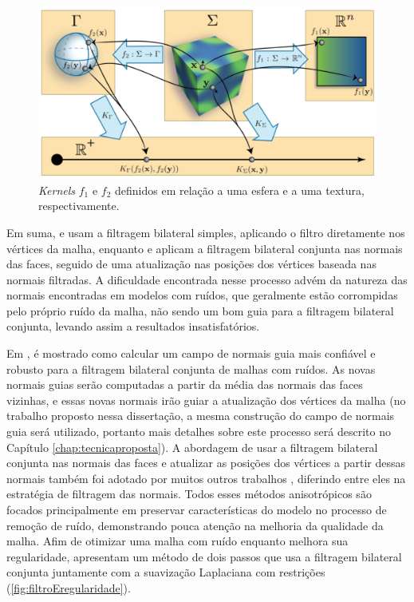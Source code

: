 \begin{figure}[!h]
\captionsetup{width=\linewidth}
\centering
\includegraphics[scale=0.3]{figuras/kernelframework.png}
\caption{\textit{Kernels} $f_1$ e $f_2$ definidos em relação a uma esfera e a uma textura, respectivamente.}
\label{fig:kernelframework}
\end{figure}

Em suma, \cite{fleishman2003bilateral} e \cite{jones2003non} usam a filtragem bilateral simples, aplicando o filtro diretamente nos vértices da malha, enquanto \cite{zheng2011bilateral} e \cite{solomon2014general} aplicam a filtragem bilateral conjunta nas normais das faces, seguido de uma atualização nas posições dos vértices baseada nas normais filtradas. A dificuldade encontrada nesse processo advém da natureza das normais encontradas em modelos com ruídos, que geralmente estão corrompidas pelo próprio ruído da malha, não sendo um bom guia para a filtragem bilateral conjunta, levando assim a resultados insatisfatórios.

Em \cite{zhang2015guided}, é mostrado como calcular um campo de normais guia mais confiável e robusto para a filtragem bilateral conjunta de malhas com ruídos. As novas normais guias serão computadas a partir da média das normais das faces vizinhas, e essas novas normais irão guiar a atualização dos vértices da malha (no trabalho proposto nessa dissertação, a mesma construção do campo de normais guia será utilizado, portanto mais detalhes sobre este processo será descrito no Capítulo \ref{chap:tecnicaproposta}). A abordagem de usar a filtragem bilateral conjunta nas normais das faces e atualizar as posições dos vértices a partir dessas normais também foi adotado por muitos outros trabalhos \cite{sun2007fast, yagou2002mesh, chen2005sharpness, sun2008random}, diferindo entre eles na estratégia de filtragem das normais. Todos esses métodos anisotrópicos são focados principalmente em preservar características do modelo no processo de remoção de ruído, demonstrando pouca atenção na melhoria da qualidade da malha. Afim de otimizar uma malha com ruído enquanto melhora sua regularidade, \cite{wei2013feature} apresentam um método de dois passos que usa a filtragem bilateral conjunta juntamente com a suavização Laplaciana com restrições (\ref{fig:filtroEregularidade}). 

